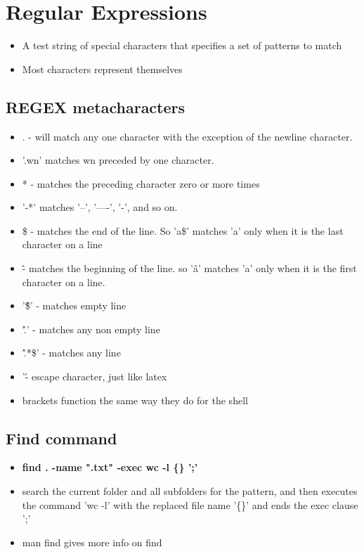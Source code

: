 \documentclass{article}
\begin{document}
\section*{Regular Expressions}
\begin{itemize}
  \item A test string of special characters that specifies a set of patterns to match
  \item Most characters represent themselves
\end{itemize}
\subsection*{REGEX metacharacters}
\begin{itemize}
  \item . - will match any one character with the exception of the newline character.
  \item '.wn' matches wn preceded by one character.
  \item * - matches the preceding character zero or more times
  \item '-*' matches '--', '----', '-', and so on.
  \item \$ - matches the end of the line. So 'a\$' matches 'a' only when it is the last character on a line
  \item \^ - matches the beginning of the line. so '\^a' matches 'a' only when it is the first character on a line.
  \item '\^\$' - matches empty line
  \item '\^.' - matches any non empty line
  \item '\^.*\$' - matches any line
  \item '\' - escape character, just like latex
  \item brackets function the same way they do for the shell 
\end{itemize}
\subsection*{Find command}
\begin{itemize}
  \item \textbf{find . -name ".txt" -exec wc -l \{\} ';'}
  \item search the current folder and all subfolders for the pattern, and then executes the command 'wc -l' with the replaced file name '\{\}' and ends the exec clause ';'
  \item man find gives more info on find
\end{itemize}
\end{document}
